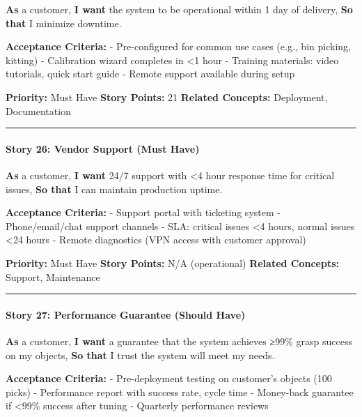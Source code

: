 \documentclass[
]{article}
\begin{document}
\textbf{As} a customer, \textbf{I want} the system to be operational
within 1 day of delivery, \textbf{So that} I minimize downtime.

\textbf{Acceptance Criteria:} - Pre-configured for common use cases
(e.g., bin picking, kitting) - Calibration wizard completes in
\textless1 hour - Training materials: video tutorials, quick start guide
- Remote support available during setup

\textbf{Priority:} Must Have \textbf{Story Points:} 21 \textbf{Related
Concepts:} Deployment, Documentation

\begin{center}\rule{0.5\linewidth}{0.5pt}\end{center}

\hypertarget{story-26-vendor-support-must-have}{%
\paragraph{Story 26: Vendor Support (Must
Have)}\label{story-26-vendor-support-must-have}}

\textbf{As} a customer, \textbf{I want} 24/7 support with \textless4
hour response time for critical issues, \textbf{So that} I can maintain
production uptime.

\textbf{Acceptance Criteria:} - Support portal with ticketing system -
Phone/email/chat support channels - SLA: critical issues \textless4
hours, normal issues \textless24 hours - Remote diagnostics (VPN access
with customer approval)

\textbf{Priority:} Must Have \textbf{Story Points:} N/A (operational)
\textbf{Related Concepts:} Support, Maintenance

\begin{center}\rule{0.5\linewidth}{0.5pt}\end{center}

\hypertarget{story-27-performance-guarantee-should-have}{%
\paragraph{Story 27: Performance Guarantee (Should
Have)}\label{story-27-performance-guarantee-should-have}}

\textbf{As} a customer, \textbf{I want} a guarantee that the system
achieves ≥99\% grasp success on my objects, \textbf{So that} I trust the
system will meet my needs.

\textbf{Acceptance Criteria:} - Pre-deployment testing on customer's
objects (100 picks) - Performance report with success rate, cycle time -
Money-back guarantee if \textless99\% success after tuning - Quarterly
performance reviews
\end{document}
